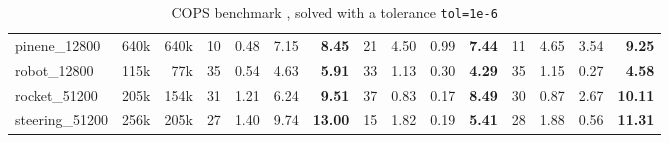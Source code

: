 \begin{table}[!ht]
{\begin{tabular}{|l|rr|rrr >{\bfseries}r|rrr >{\bfseries}r|rrr >{\bfseries}r|}
      pinene\_12800 & 640k & 640k & 10 & 0.48 & 7.15 & 8.45 & 21 & 4.50 & 0.99 & 7.44 & 11 & 4.65 & 3.54 & 9.25 \\
      robot\_12800 & 115k & 77k & 35 & 0.54 & 4.63 & 5.91 & 33 & 1.13 & 0.30 & 4.29 & 35 & 1.15 & 0.27 & 4.58 \\
      rocket\_51200 & 205k & 154k & 31 & 1.21 & 6.24 & 9.51 & 37 & 0.83 & 0.17 & 8.49 & 30 & 0.87 & 2.67 & 10.11 \\
      steering\_51200 & 256k & 205k & 27 & 1.40 & 9.74 & 13.00 & 15 & 1.82 & 0.19 & 5.41 & 28 & 1.88 & 0.56 & 11.31 \\
      \hline
    \end{tabular}
  }
  \caption{COPS benchmark , solved with a tolerance {\tt tol=1e-6}\label{tab:cops:benchmark}}
\end{table}


